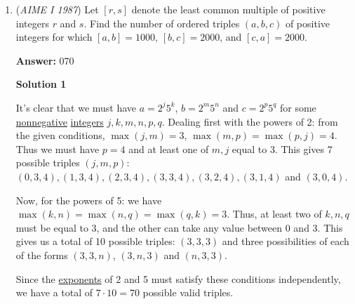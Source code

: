 \begin{enumerate}
\textbf{Solution 3}

Since $XY = YB + BC + CZ = ZW = WD + DA + AX$. Let $a = AX + DW = BY + CZ$. Since $2AB - 2a = XY = WZ$, then $XY = AB - a$.Let $S$ be the midpoint of $DA$, and $T$ be the midpoint of $CB$. Since the area of $PQWZ$ and $PQYX$ are the same, then their heights are the same, and so $PQ$ is \href{https://artofproblemsolving.com/wiki/index.php?title=Equidistant}{equidistant} from $AB$ and $CD$. This means that $PS$ is perpendicular to $DA$, and $QT$ is perpendicular to $BC$. Therefore, $PSCW$, $PSAX$, $QZCT$, and $QYTB$ are all trapezoids, and $QT = (AB - 87)/$2. This implies that 
 \[((a + 2((AB - 87)/2)/2) \cdot 19 = (((AB - a) + 87)/2) \cdot 19\] 
 \[(a + AB - 87) = AB - a + 87\] 
 \[2a = 174\] 
 \[a = 87\] Since $a + CB = XY$, $XY = 19 + 87 = 106$, and $AB = 106 + 87 = \boxed{193}$.

 


	\item (\textit{AIME I 1987}) Let $[r,s]$ denote the least common multiple of positive integers $r$ and $s$.  Find the number of ordered triples $(a,b,c)$ of positive integers for which $[a,b] = 1000$, $[b,c] = 2000$, and $[c,a] = 2000$.


 
 \textbf{Answer: }070



\textbf{Solution 1}

It's clear that we must have $a = 2^j5^k$, $b = 2^m 5^n$ and $c = 2^p5^q$ for some \href{https://artofproblemsolving.com/wiki/index.php?title=Nonnegative}{nonnegative} \href{https://artofproblemsolving.com/wiki/index.php?title=Integer}{integers} $j, k, m, n, p, q$.  Dealing first with the powers of 2: from the given conditions, $\max(j, m) = 3$, $\max(m, p) = \max(p, j) = 4$.  Thus we must have $p = 4$ and at least one of $m, j$ equal to 3.  This gives 7 possible triples $(j, m, p)$: $(0, 3, 4), (1, 3, 4), (2, 3, 4), (3, 3, 4), (3, 2, 4), (3, 1, 4)$ and $(3, 0, 4)$.

 Now, for the powers of 5: we have $\max(k, n) = \max(n, q) = \max(q, k) = 3$.  Thus, at least two of $k, n, q$ must be equal to 3, and the other can take any value between 0 and 3.  This gives us a total of 10 possible triples: $(3, 3, 3)$ and three possibilities of each of the forms $(3, 3, n)$, $(3, n, 3)$ and $(n, 3, 3)$.

 Since the \href{https://artofproblemsolving.com/wiki/index.php?title=Exponent}{exponents} of 2 and 5 must satisfy these conditions independently, we have a total of $7 \cdot 10 = 70$ possible valid triples.


\end{enumerate}
